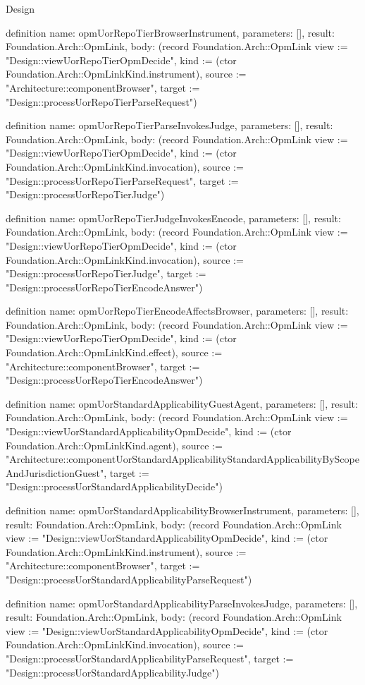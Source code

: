 \begin{lexlean}{Design}
\begin{semanticmodule}
definition{
  name: opmUorRepoTierBrowserInstrument,
  parameters: [],
  result: Foundation.Arch::OpmLink,
  body: (record Foundation.Arch::OpmLink {view := "Design::viewUorRepoTierOpmDecide", kind := (ctor Foundation.Arch::OpmLinkKind.instrument), source := "Architecture::componentBrowser", target := "Design::processUorRepoTierParseRequest"})
}

definition{
  name: opmUorRepoTierParseInvokesJudge,
  parameters: [],
  result: Foundation.Arch::OpmLink,
  body: (record Foundation.Arch::OpmLink {view := "Design::viewUorRepoTierOpmDecide", kind := (ctor Foundation.Arch::OpmLinkKind.invocation), source := "Design::processUorRepoTierParseRequest", target := "Design::processUorRepoTierJudge"})
}

definition{
  name: opmUorRepoTierJudgeInvokesEncode,
  parameters: [],
  result: Foundation.Arch::OpmLink,
  body: (record Foundation.Arch::OpmLink {view := "Design::viewUorRepoTierOpmDecide", kind := (ctor Foundation.Arch::OpmLinkKind.invocation), source := "Design::processUorRepoTierJudge", target := "Design::processUorRepoTierEncodeAnswer"})
}

definition{
  name: opmUorRepoTierEncodeAffectsBrowser,
  parameters: [],
  result: Foundation.Arch::OpmLink,
  body: (record Foundation.Arch::OpmLink {view := "Design::viewUorRepoTierOpmDecide", kind := (ctor Foundation.Arch::OpmLinkKind.effect), source := "Architecture::componentBrowser", target := "Design::processUorRepoTierEncodeAnswer"})
}

definition{
  name: opmUorStandardApplicabilityGuestAgent,
  parameters: [],
  result: Foundation.Arch::OpmLink,
  body: (record Foundation.Arch::OpmLink {view := "Design::viewUorStandardApplicabilityOpmDecide", kind := (ctor Foundation.Arch::OpmLinkKind.agent), source := "Architecture::componentUorStandardApplicabilityStandardApplicabilityByScopeAndJurisdictionGuest", target := "Design::processUorStandardApplicabilityDecide"})
}

definition{
  name: opmUorStandardApplicabilityBrowserInstrument,
  parameters: [],
  result: Foundation.Arch::OpmLink,
  body: (record Foundation.Arch::OpmLink {view := "Design::viewUorStandardApplicabilityOpmDecide", kind := (ctor Foundation.Arch::OpmLinkKind.instrument), source := "Architecture::componentBrowser", target := "Design::processUorStandardApplicabilityParseRequest"})
}

definition{
  name: opmUorStandardApplicabilityParseInvokesJudge,
  parameters: [],
  result: Foundation.Arch::OpmLink,
  body: (record Foundation.Arch::OpmLink {view := "Design::viewUorStandardApplicabilityOpmDecide", kind := (ctor Foundation.Arch::OpmLinkKind.invocation), source := "Design::processUorStandardApplicabilityParseRequest", target := "Design::processUorStandardApplicabilityJudge"})
}


\end{semanticmodule}
\end{lexlean}
